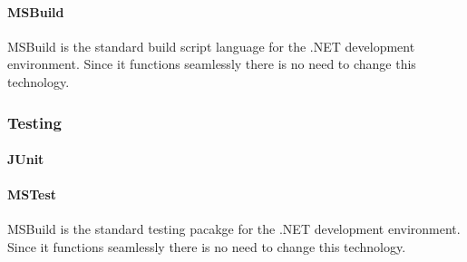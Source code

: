 \documentclass[11pt,a4paper,titlepage]{article}
\begin{document}
			\paragraph{MSBuild}
				MSBuild is the standard build script language for the .NET development environment. Since it functions seamlessly there is no need to change this technology.
		\subsubsection{Testing}
			\paragraph{JUnit}
			\paragraph{MSTest}
				MSBuild is the standard testing pacakge for the .NET development environment. Since it functions seamlessly there is no need to change this technology.
	
	



%  
\end{document}
